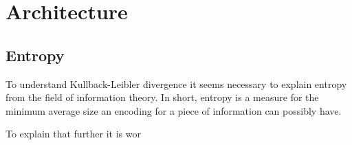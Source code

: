 \section{Architecture}
\subsection{Entropy}

To understand Kullback-Leibler divergence it seems necessary to explain entropy from
the field of information theory. In short, entropy is a measure for the minimum average size an
encoding for a piece of information can possibly have.

To explain that further it is wor